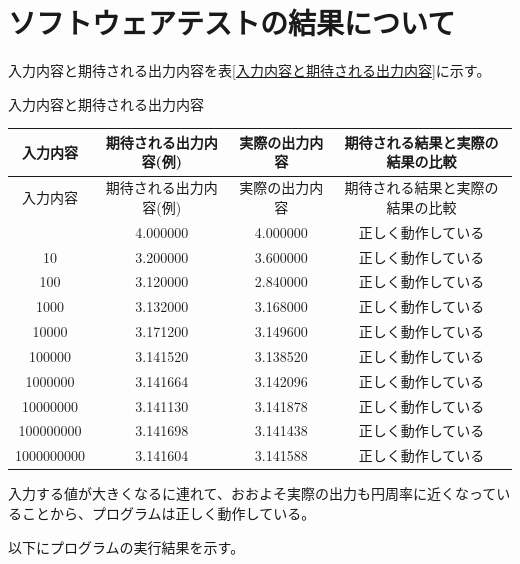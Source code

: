 

\section{ソフトウェアテストの結果について}
入力内容と期待される出力内容を表\ref{入力内容と期待される出力内容}に示す。
\begin{table}[H]
    \centering
    \caption{入力内容と期待される出力内容}
    \label{入力内容と期待される出力内容}
\end{table}
\begin{longtable}{|c|c|c|c|} %
    \hline
    入力内容 & 期待される出力内容(例) & 実際の出力内容 & 期待される結果と実際の結果の比較 \\ \hline
    \endfirsthead
    \hline
    入力内容 & 期待される出力内容(例) & 実際の出力内容 & 期待される結果と実際の結果の比較 \\ \hline
    \endhead
    \endfoot
    1 & 4.000000 & 4.000000 & 正しく動作している \\
    10 & 3.200000 & 3.600000 & 正しく動作している \\
    100 & 3.120000 & 2.840000 & 正しく動作している \\
    1000 & 3.132000 & 3.168000 & 正しく動作している \\
    10000 & 3.171200 & 3.149600 & 正しく動作している \\
    100000 & 3.141520 & 3.138520 & 正しく動作している \\
    1000000 & 3.141664 & 3.142096 & 正しく動作している \\
    10000000 & 3.141130 & 3.141878 & 正しく動作している \\
    100000000 & 3.141698 & 3.141438 & 正しく動作している \\
    1000000000 & 3.141604 & 3.141588 & 正しく動作している \\
    \hline
\end{longtable}
入力する値が大きくなるに連れて、おおよそ実際の出力も円周率に近くなっていることから、プログラムは正しく動作している。

以下にプログラムの実行結果を示す。

